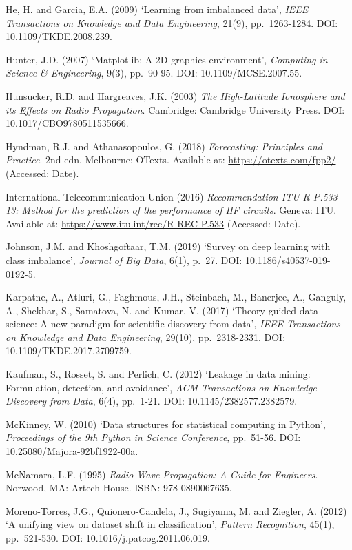 He, H. and Garcia, E.A. (2009) `Learning from imbalanced data',
\emph{IEEE Transactions on Knowledge and Data Engineering}, 21(9),
pp.~1263-1284. DOI: 10.1109/TKDE.2008.239.

Hunter, J.D. (2007) `Matplotlib: A 2D graphics environment',
\emph{Computing in Science \& Engineering}, 9(3), pp.~90-95. DOI:
10.1109/MCSE.2007.55.

Hunsucker, R.D. and Hargreaves, J.K. (2003) \emph{The High-Latitude
Ionosphere and its Effects on Radio Propagation}. Cambridge: Cambridge
University Press. DOI: 10.1017/CBO9780511535666.

Hyndman, R.J. and Athanasopoulos, G. (2018) \emph{Forecasting:
Principles and Practice}. 2nd edn. Melbourne: OTexts. Available at:
\url{https://otexts.com/fpp2/} (Accessed: Date).

International Telecommunication Union (2016) \emph{Recommendation ITU-R
P.533-13: Method for the prediction of the performance of HF circuits}.
Geneva: ITU. Available at: \url{https://www.itu.int/rec/R-REC-P.533}
(Accessed: Date).

Johnson, J.M. and Khoshgoftaar, T.M. (2019) `Survey on deep learning
with class imbalance', \emph{Journal of Big Data}, 6(1), p.~27. DOI:
10.1186/s40537-019-0192-5.

Karpatne, A., Atluri, G., Faghmous, J.H., Steinbach, M., Banerjee, A.,
Ganguly, A., Shekhar, S., Samatova, N. and Kumar, V. (2017)
`Theory-guided data science: A new paradigm for scientific discovery
from data', \emph{IEEE Transactions on Knowledge and Data Engineering},
29(10), pp.~2318-2331. DOI: 10.1109/TKDE.2017.2709759.

Kaufman, S., Rosset, S. and Perlich, C. (2012) `Leakage in data mining:
Formulation, detection, and avoidance', \emph{ACM Transactions on
Knowledge Discovery from Data}, 6(4), pp.~1-21. DOI:
10.1145/2382577.2382579.

McKinney, W. (2010) `Data structures for statistical computing in
Python', \emph{Proceedings of the 9th Python in Science Conference},
pp.~51-56. DOI: 10.25080/Majora-92bf1922-00a.

McNamara, L.F. (1995) \emph{Radio Wave Propagation: A Guide for
Engineers}. Norwood, MA: Artech House. ISBN: 978-0890067635.

Moreno-Torres, J.G., Quionero-Candela, J., Sugiyama, M. and Ziegler, A.
(2012) `A unifying view on dataset shift in classification',
\emph{Pattern Recognition}, 45(1), pp.~521-530. DOI:
10.1016/j.patcog.2011.06.019.

